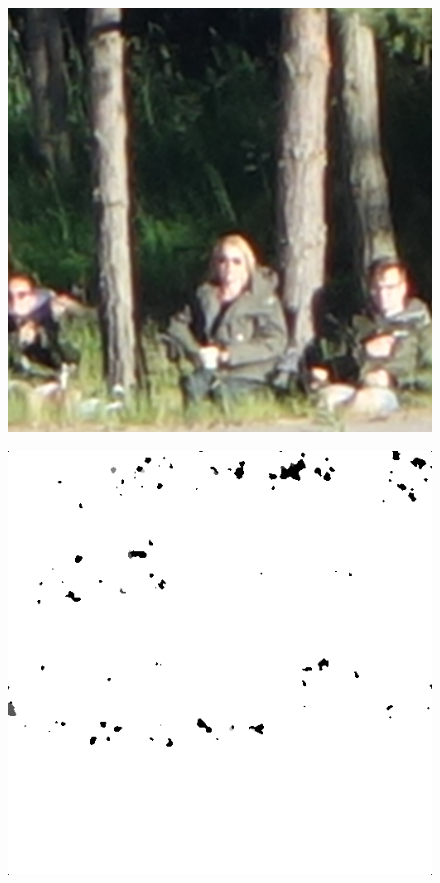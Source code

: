 \begin{figure}[H]
\begin{minipage}[t]{0.3\linewidth}
	\label{fig:hus_org}
\end{minipage}
\begin{minipage}[t]{0.3\linewidth} %
	\includegraphics[width = 1\linewidth]{gfx/sit/sit_org.png}
	\label{fig:sit_org}
\end{minipage}
\begin{minipage}[t]{0.3\linewidth} %
	\includegraphics[width = 1\linewidth]{gfx/car/car_m5.png}

\end{minipage}
\end{figure}
